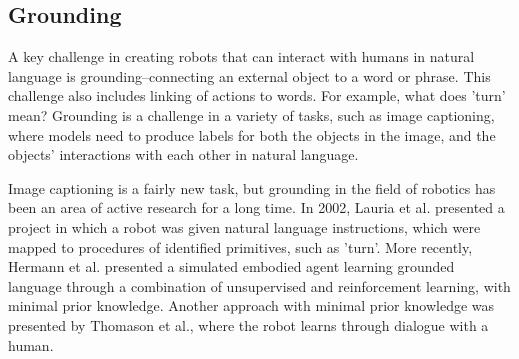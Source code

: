 \documentclass{article}
\begin{document}


\subsection{Grounding}
A key challenge in creating robots that can interact with humans in natural language is grounding--connecting an external object to a word or phrase. This challenge also includes linking of actions to words. For example, what does 'turn' mean? Grounding is a challenge in a variety of tasks, such as image captioning, where models need to produce labels for both the objects in the image, and the objects' interactions with each other in natural language\cite{karpathy2014captioning}.


Image captioning is a fairly new task, but grounding in the field of robotics has been an area of active research for a long time. In 2002, Lauria et al. presented a project in which a robot was given natural language instructions, which were mapped to procedures of identified primitives, such as 'turn'\cite{lauria2002}. More recently, Hermann et al. presented a simulated embodied agent learning grounded language through a combination of unsupervised and reinforcement learning, with minimal prior knowledge\cite{hermann2017grounded}. Another approach with minimal prior knowledge was presented by Thomason et al., where the robot learns through dialogue with a human\cite{thomason2019grounded}.
\end{document}
